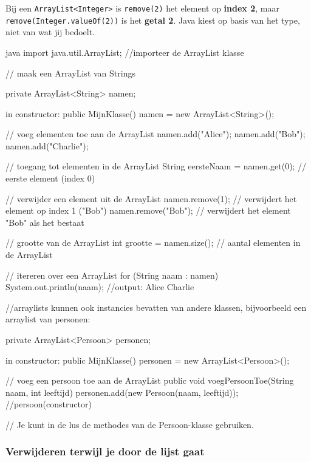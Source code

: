 \documentclass[a4paper,11pt]{article}
\begin{document}
\begin{warningbox}
    Bij een \texttt{ArrayList<Integer>} is \texttt{remove(2)} het element op
    \textbf{index 2}, maar \texttt{remove(Integer.valueOf(2))} is het \textbf{getal
        2}. Java kiest op basis van het type, niet van wat jij bedoelt.
\end{warningbox}

\begin{codeblock}[arraylist]{java}
    import java.util.ArrayList; //importeer de ArrayList klasse

    // maak een ArrayList van Strings

    private ArrayList<String> namen;

    in constructor:
    public MijnKlasse()
    {
            namen = new ArrayList<String>();
        }

    // voeg elementen toe aan de ArrayList
    namen.add("Alice");
    namen.add("Bob");
    namen.add("Charlie");

    // toegang tot elementen in de ArrayList
    String eersteNaam = namen.get(0); // eerste element (index 0)

    // verwijder een element uit de ArrayList
    namen.remove(1); // verwijdert het element op index 1 ("Bob")
    namen.remove("Bob"); // verwijdert het element "Bob" als het bestaat

    // grootte van de ArrayList
    int grootte = namen.size(); // aantal elementen in de ArrayList

    // itereren over een ArrayList
    for (String naam : namen)
    {
            System.out.println(naam);
            //output: Alice Charlie
        }

    //arraylists kunnen ook instancies bevatten van
    andere klassen,
    bijvoorbeeld een arraylist van personen:

    private ArrayList<Persoon> personen;

    in constructor:
    public MijnKlasse()
    {
            personen = new ArrayList<Persoon>();
        }

    // voeg een persoon toe aan de ArrayList
    public void voegPersoonToe(String naam, int leeftijd)
    {
            personen.add(new Persoon(naam, leeftijd)); //persoon(constructor)
        }

    // Je kunt in de lus de methodes van de Persoon-klasse gebruiken.
\end{codeblock}

\subsubsection{Verwijderen terwijl je door de lijst gaat}
\end{document}

